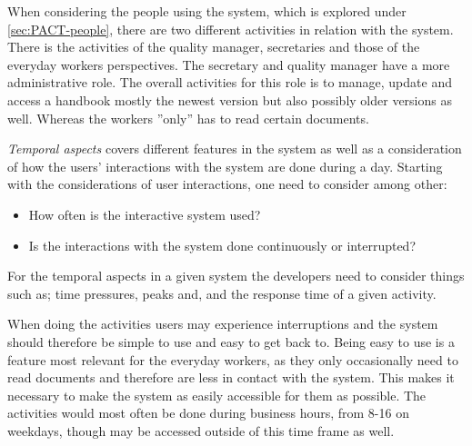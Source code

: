 When considering the people using the system, which is explored under \cref{sec:PACT-people}, there are two different activities in relation with the system.
There is the activities of the quality manager, secretaries and those of the everyday workers perspectives.
The secretary and quality manager have a more administrative role.
The overall activities for this role is to manage, update and access a handbook mostly the newest version but also possibly older versions as well.
Whereas the workers ''only'' has to read certain documents.

\textit{Temporal aspects} covers different features in the system as well as a consideration of how the users' interactions with the system are done during a day.
Starting with the considerations of user interactions, one need to consider among other:

\begin{itemize}
	\item How often is the interactive system used?
	\item Is the interactions with the system done continuously or interrupted?
\end{itemize}

For the temporal aspects in a given system the developers need to consider things such as; time pressures, peaks and, and the response time of a given activity.

When doing the activities users may experience interruptions and the system should therefore be simple to use and easy to get back to.
Being easy to use is a feature most relevant for the everyday workers, as they only occasionally need to read documents and therefore are less in contact with the system.
This makes it necessary to make the system as easily accessible for them as possible.
The activities would most often be done during business hours, from 8-16 on weekdays, though may be accessed outside of this time frame as well.


